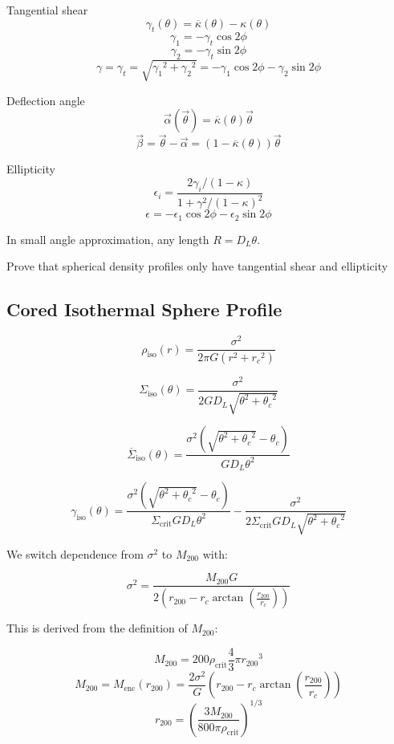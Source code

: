 \documentclass[10pt]{article}
\begin{document}
Tangential shear
\[\gamma_t(\theta) = \overline{\kappa}(\theta) - \kappa(\theta)\]
\[\gamma_1 = -\gamma_t \cos{2\phi}\]
\[\gamma_2 = -\gamma_t \sin{2\phi}\]
\[\gamma = \gamma_t = \sqrt{{\gamma_1}^2 + {\gamma_2}^2} = -\gamma_1 \cos{2\phi} -\gamma_2 \sin{2\phi}\]

Deflection angle
\[\vec{\alpha}(\vec{\theta}) = \overline{\kappa}(\theta)\vec{\theta}\]
\[\vec{\beta} = \vec{\theta} - \vec{\alpha} = (1 - \overline{\kappa}(\theta))\vec{\theta} \]

Ellipticity
\[\epsilon_i = \frac{2 \gamma_i/(1 - \kappa)}{1 + \gamma^2/(1 - \kappa)^2}\]
\[\epsilon =  -\epsilon_1 \cos{2\phi} -\epsilon_2 \sin{2\phi}\]

In small angle approximation, any length $R = D_L \theta$.

Prove that spherical density profiles only have tangential shear and ellipticity


\subsection{Cored Isothermal Sphere Profile}

\[\rho_\mathrm{iso}(r) = \frac{\sigma^2}{2\pi G (r^2 + {r_c}^2)}\]

%
%

\[\Sigma_\mathrm{iso}(\theta) = \frac{\sigma^2}{2 G D_L \sqrt{\theta^2 + {\theta_c}^2}}\]

\[\overline{\Sigma}_\mathrm{iso}(\theta) = \frac{\sigma^2 \left(\sqrt{\theta^2 + {\theta_c}^2} - \theta_c \right)}{G D_L \theta^2}\]

\[\gamma_\mathrm{iso}(\theta) = \frac{\sigma^2 \left(\sqrt{\theta^2 + {\theta_c}^2} - \theta_c \right)}{\Sigma_\mathrm{crit} G D_L \theta^2} - \frac{\sigma^2}{2 \Sigma_\mathrm{crit} G D_L \sqrt{\theta^2 + {\theta_c}^2}}\]

We switch dependence from $\sigma^2$ to $M_{200}$ with:

\[\sigma^2 = \frac{M_{200} G}{2 \left( r_{200} - r_c \arctan{\left(\frac{r_{200}}{r_c}\right)} \right)}\]

This is derived from the definition of $M_{200}$:

\[M_{200} = 200 \rho_\mathrm{crit} \frac{4}{3} \pi {r_{200}}^3\]
\[M_{200} = M_\mathrm{enc}(r_{200}) = \frac{2 \sigma^2}{G} \left( r_{200} - r_c \arctan{\left(\frac{r_{200}}{r_c}\right)} \right)\]
\[r_{200} = \left( \frac{3 M_{200}}{800 \pi \rho_\mathrm{crit}} \right)^{1/3}\]
\end{document}
